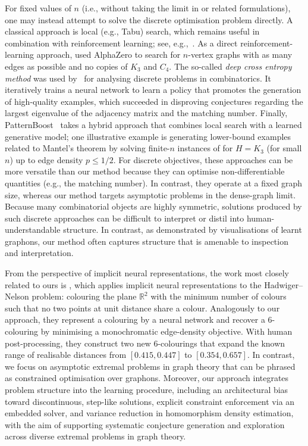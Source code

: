 \documentclass{article}
\theoremstyle{plain}
\theoremstyle{definition}
\theoremstyle{remark}
\begin{document}
For fixed values of $n$ (i.e., without taking the limit in  or related formulations), one may instead attempt to solve the discrete optimisation problem directly. A classical approach is local (e.g., Tabu) search, which remains useful in combination with reinforcement learning; see, e.g.,~\citet{parczyk2025new,mehrabian2024finding}.
As a direct reinforcement-learning approach, \citet{mehrabian2024finding} used {\sc AlphaZero} to search for $n$-vertex graphs with as many edges as possible and no copies of $K_3$ and $C_4$.
The so-called \emph{deep cross entropy method} was used by~\citet{wagner2021constructions} for analysing discrete problems in combinatorics. It iteratively trains a neural network to learn a policy that promotes the generation of high-quality examples, which succeeded in disproving conjectures regarding the largest eigenvalue of the adjacency matrix and the matching number.
Finally, {\sc PatternBoost}~\citep{charton2024patternboost} takes a hybrid approach that combines local search with a learned generative model; one illustrative example is generating lower-bound examples related to Mantel's theorem by solving finite-$n$ instances of  for $H=K_3$ (for small $n$) up to edge density $p \le 1/2$.
For discrete objectives, these approaches can be more versatile than our method because they can optimise non-differentiable quantities (e.g., the matching number). In contrast, they operate at a fixed graph size, whereas our method targets asymptotic problems in the dense-graph limit.
Because many combinatorial objects are highly symmetric, solutions produced by such discrete approaches can be difficult to interpret or distil into human-understandable structure. 
In contrast, as demonstrated by visualisations of learnt graphons, our method often captures structure that is amenable to inspection and interpretation.

From the perspective of implicit neural representations, the work most closely related to ours is \citet{mundinger2025neural}, which applies implicit neural representations to the Hadwiger--Nelson problem: colouring the plane $\mathbb{R}^2$ with the minimum number of colours such that no two points at unit distance share a colour. Analogously to our approach, they represent a colouring by a neural network and recover a 6-colouring by minimising a monochromatic edge-density objective. With human post-processing, they construct two new 6-colourings that expand the known range of realisable distances from $[0.415, 0.447]$ to $[0.354, 0.657]$. In contrast, we focus on asymptotic extremal problems in graph theory that can be phrased as constrained optimisation over graphons. Moreover, our approach integrates problem structure into the learning procedure, including an architectural bias toward discontinuous, step-like solutions, explicit constraint enforcement via an embedded solver, and variance reduction in homomorphism density estimation, with the aim of supporting systematic conjecture generation and exploration across diverse extremal problems in graph theory.
\end{document}
